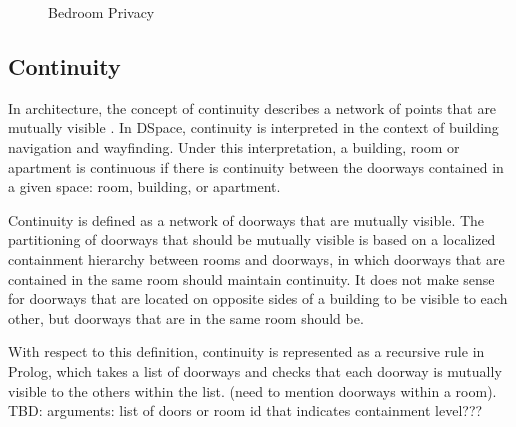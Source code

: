 \documentclass[12pt]{ucthesis}
\begin{document}
\begin{figure}[H]
 \centering
  \hspace{5mm}
 \caption{Bedroom Privacy}
\label{room-privacy}
\end{figure}

\subsection{Continuity}
In architecture, the concept of continuity describes a network of points that are mutually visible \cite{Key}. In DSpace, continuity is interpreted in the context of building navigation and wayfinding. Under this interpretation, a building, room or apartment is continuous if there is continuity between the doorways contained in a given space: room, building, or apartment. 

Continuity is defined as a network of doorways that are mutually visible. The partitioning of doorways that should be mutually visible is based on a localized containment hierarchy between rooms and doorways, in which doorways that are contained in the same room should maintain continuity. It does not make sense for doorways that are located on opposite sides of a building to be visible to each other, but doorways that are in the same room should be. 

With respect to this definition, continuity is represented as a recursive rule in Prolog, which takes a list of doorways and checks that each doorway is mutually visible to the others within the list. (need to mention doorways within a room). TBD: arguments: list of doors or room id that indicates containment level???
\end{document}
